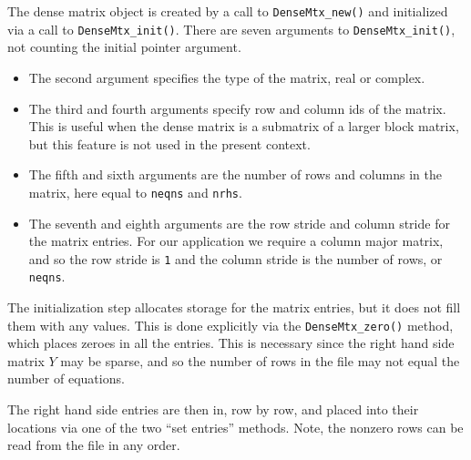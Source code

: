 The dense matrix object is created by a call to {\tt DenseMtx\_new()}
and initialized via a call to {\tt DenseMtx\_init()}.
There are seven arguments to {\tt DenseMtx\_init()}, not counting
the initial pointer argument.
\begin{itemize}
\item
The second argument specifies the type of the matrix, real or
complex.
\item
The third and fourth arguments specify row and column ids of the
matrix.
This is useful when the dense matrix is a submatrix of a larger
block matrix, but this feature is not used in the present context.
\item
The fifth and sixth arguments are the number of rows and columns in
the matrix, here equal to {\tt neqns} and {\tt nrhs}.
\item
The seventh and eighth arguments are the row stride and column
stride for the matrix entries.
For our application we require a column major matrix, and so
the row stride is {\tt 1} and the column stride is the number of
rows, or {\tt neqns}.
\end{itemize}
The initialization step allocates storage for the matrix entries,
but it does not fill them with any values.
This is done explicitly via the {\tt DenseMtx\_zero()} method,
which places zeroes in all the entries.
This is necessary since the right hand side matrix $Y$ may be
sparse, and so the number of rows in the file may not equal the
number of equations.
\par
The right hand side entries are then in, row by row, and placed
into their locations via one of the two ``set entries'' methods.
Note, the nonzero rows can be read from the file in any order.
\par
